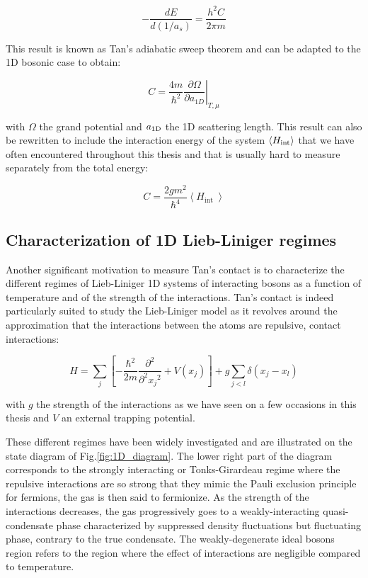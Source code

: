\begin{equation}
    -\frac{d E}{d(1 / a_s)}=\frac{h^{2} C}{2 \pi m}
\end{equation}

\noindent This result is known as Tan's adiabatic sweep theorem and can be adapted to the 1D bosonic case \cite{barth2011tan} to obtain:

\begin{equation}
    C=\left.\frac{4 m}{\hbar^{2}} \frac{\partial \Omega}{\partial a_{1 D}}\right|_{T, \mu}
\end{equation}

\noindent with $\Omega$ the grand potential and $a_{\rm{1D}}$ the 1D scattering length. This result can also be rewritten to include the interaction energy of the system $\langle H_{\rm{int}}\rangle$ that we have often encountered throughout this thesis and that is usually hard to measure separately from the total energy:

\begin{equation}
    C=\frac{2 g m^{2}}{\hbar^{4}}\left\langle H_{\text {int }}\right\rangle
    \label{eq:C_with_int}
\end{equation}

\subsection{Characterization of 1D Lieb-Liniger regimes}

Another significant motivation to measure Tan's contact is to characterize the different regimes of Lieb-Liniger 1D systems of interacting bosons as a function of temperature and of the strength of the interactions. Tan's contact is indeed particularly suited to study the Lieb-Liniger model as it revolves around the approximation that the interactions between the atoms are repulsive, contact interactions:

\begin{equation}
    H = \sum_j \left[ - \frac{ \hbar^2}{2m} \frac{\partial^2}{\partial^2 {x_j}^2} + V(x_j) \right] + g \sum_{j<l} \delta(x_j - x_l) 
    \label{eq:lieb_liniger}
\end{equation}

\noindent with $g$ the strength of the interactions as we have seen on a few occasions in this thesis and $V$ an external trapping potential. 


These different regimes have been widely investigated \cite{petrov2000regimes} and are illustrated on the state diagram of Fig.\ref{fig:1D_diagram}. The lower right part of the diagram corresponds to the strongly interacting or Tonks-Girardeau regime where the repulsive interactions are so strong that they mimic the Pauli exclusion principle for fermions, the gas is then said to fermionize. As the strength of the interactions decreases, the gas progressively goes to a weakly-interacting quasi-condensate phase characterized by suppressed density fluctuations but fluctuating phase, contrary to the true condensate. The weakly-degenerate ideal bosons region refers to the region where the effect of interactions are negligible compared to temperature. 

